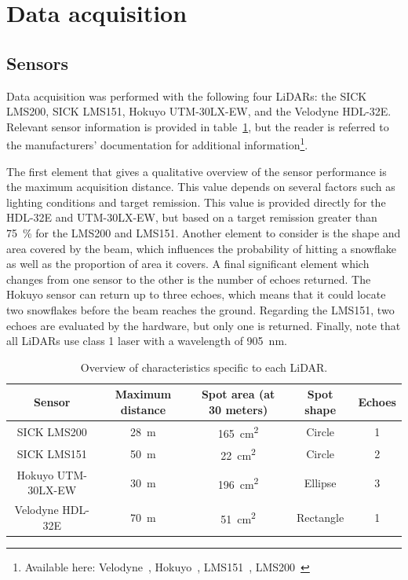 \section{Data acquisition}

\subsection{Sensors}

Data acquisition was performed with the following four LiDARs: the SICK LMS200, SICK LMS151, Hokuyo UTM-30LX-EW, and the Velodyne HDL-32E. Relevant sensor information is provided in table~\ref{tab:lidars}, but the reader is referred to the manufacturers' documentation for additional information\footnote{Available here: Velodyne~\cite{VelodyneManual}, Hokuyo~\cite{UTMDatasheet}, LMS151~\cite{LMS151Datasheet}, LMS200~\cite{LMS200Manual}}.

The first element that gives a qualitative overview of the sensor performance is the maximum acquisition distance. This value depends on several factors such as lighting conditions and target remission. This value is provided directly for the HDL-32E and UTM-30LX-EW, but based on a target remission greater than \SI{75}{\percent} for the LMS200 and LMS151. Another element to consider is the shape and area covered by the beam, which influences the probability of hitting a snowflake as well as the proportion of area it covers. A final significant element which changes from one sensor to the other is the number of echoes returned. The Hokuyo sensor can return up to three echoes, which means that it could locate two snowflakes before the beam reaches the ground. Regarding the LMS151, two echoes are evaluated by the hardware, but only one is returned. Finally, note that all LiDARs use class 1 laser with a wavelength of \SI{905}{\nano\meter}.

\begin{table}[htbp]
    \centering
    \begin{tabular}{|c|c|c|c|c|}
        \hline
        \textbf{Sensor}     & \textbf{Maximum distance}  & \textbf{Spot area (at 30 meters)}  & \textbf{Spot shape} & \textbf{Echoes} \\\hline
        SICK LMS200         & \SI{28}{\meter}            & \SI{165}{\centi\meter\squared}     & Circle              & 1               \\\hline
        SICK LMS151         & \SI{50}{\meter}            & \SI{22}{\centi\meter\squared}      & Circle              & 2               \\\hline
        Hokuyo UTM-30LX-EW  & \SI{30}{\meter}            & \SI{196}{\centi\meter\squared}     & Ellipse             & 3               \\\hline
        Velodyne HDL-32E    & \SI{70}{\meter}            & \SI{51}{\centi\meter\squared}      & Rectangle           & 1               \\\hline
    \end{tabular}
    \caption{Overview of characteristics specific to each LiDAR.}
    \label{tab:lidars}
\end{table}

